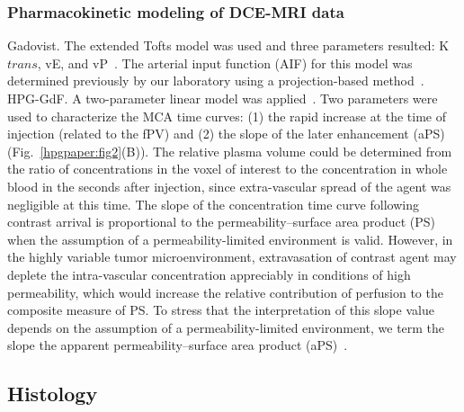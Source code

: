 \subsubsection{Pharmacokinetic modeling of DCE-MRI data}

Gadovist.
The extended Tofts model was used and three parameters resulted: K${trans}$, vE, and vP~\cite{Sourbron:2011ce}.
The arterial input function (AIF) for this model was determined previously by our laboratory using a projection-based method~\cite{Moroz:2013ee}.
HPG-GdF.
A two-parameter linear model was applied~\cite{Pathak:2005gu}.
Two parameters were used to characterize the MCA time curves: (1) the rapid increase at the time of injection (related to the fPV) and (2) the slope of the later enhancement (aPS) (Fig.~\ref{hpgpaper:fig2}(B)).
The relative plasma volume could be determined from the ratio of concentrations in the voxel of interest to the concentration in whole blood in the seconds after injection, since extra-vascular spread of the agent was negligible at this time.
The slope of the concentration time curve following contrast arrival is proportional to the permeability–surface area product (PS) when the assumption of a permeability-limited environment is valid.
However, in the highly variable tumor microenvironment, extravasation of contrast agent may deplete the intra-vascular concentration appreciably in conditions of high permeability, which would increase the relative contribution of perfusion to the composite measure of PS.
To stress that the interpretation of this slope value depends on the assumption of a permeability-limited environment, we term the slope the apparent permeability–surface area product (aPS)~\cite{DaldrupLink:2004gy,Dafni:2002kb}.

\subsection{Histology}

